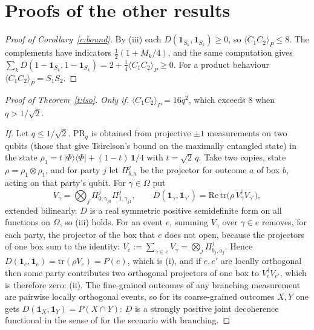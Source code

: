 \documentclass[11pt,a4paper]{article}
\theoremstyle{definition}
\theoremstyle{remark}
\newcommand{\PR}{\mathrm{PR}}
\newcommand{\ind}[1]{\mathbf{1}_{#1}}
\newcommand{\ev}[1]{\langle #1\rangle_P}
\begin{document}
\section{Proofs of the other results}

\begin{proof}[Proof of Corollary~\ref{c:bound}]
By (iii) each $D(\ind{S_k},\ind{S_k})\ge0$, so $\ev{C_1C_2}\le8$. The complements have indicators
$\tfrac12(1+M_k/4)$, and the same computation gives
$\sum_kD(1-\ind{S_k},1-\ind{S_k})=2+\tfrac14\ev{C_1C_2}\ge0$. For a product behaviour
$\ev{C_1C_2}=S_1S_2$.
\end{proof}

\begin{proof}[Proof of Theorem~\ref{t:iso}]
\emph{Only if.} $\ev{C_1C_2}=16q^2$, which exceeds $8$ when $q>1/\sqrt2$.

\emph{If.} Let $q\le1/\sqrt2$. $\PR_q$ is obtained from projective $\pm1$ measurements on two qubits
(those that give Tsirelson's bound on the maximally entangled state) in the state
$\rho_1=t\,|\Phi\rangle\langle\Phi|+(1-t)\,\mathbf 1/4$ with $t=\sqrt2\,q$. Take two copies, state
$\rho=\rho_1\otimes\rho_1$, and for party $j$ let $\Pi^j_{b,a}$ be the projector for outcome $a$ of box
$b$, acting on that party's qubit. For $\gamma\in\Omega$ put
\[
V_\gamma=\bigotimes_j\Pi^j_{0,\gamma_{j0}}\Pi^j_{1,\gamma_{j1}},\qquad
D(\ind\gamma,\ind{\gamma'})=\mathrm{Re}\,\mathrm{tr}\bigl(\rho\,V_\gamma^\dagger V_{\gamma'}\bigr),
\]
extended bilinearly. $D$ is a real symmetric positive semidefinite form on all functions on $\Omega$,
so (iii) holds. For an event $e$, summing $V_\gamma$ over $\gamma\in e$ removes, for each party, the
projector of the box that $e$ does not open, because the projectors of one box sum to the identity:
$V_e:=\sum_{\gamma\in e}V_\gamma=\bigotimes_j\Pi^j_{b_j,a_j}$. Hence $D(\ind e,\ind e)=\mathrm{tr}(\rho V_e)
=P(e)$, which is (i), and if $e,e'$ are locally orthogonal then some party contributes two orthogonal
projectors of one box to $V_e^\dagger V_{e'}$, which is therefore zero: (ii). The fine-grained outcomes
of any branching measurement are pairwise locally orthogonal events, so for its coarse-grained outcomes
$X,Y$ one gets $D(\ind X,\ind Y)=P(X\cap Y)$: $D$ is a strongly positive joint decoherence functional
in the sense of \cite{DHW} for the scenario with branching.
\end{proof}
\end{document}
